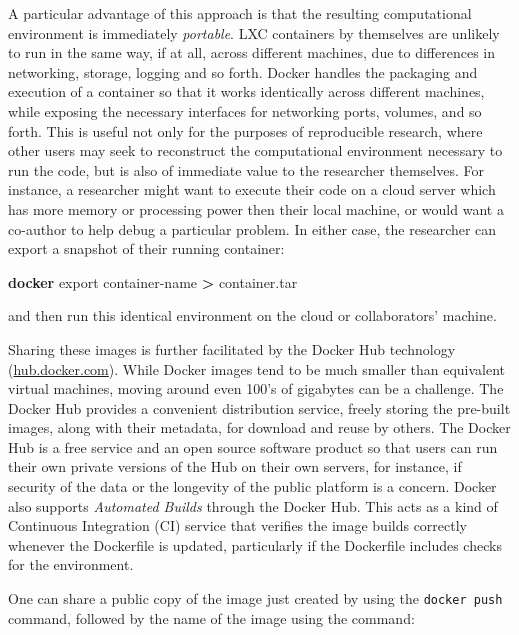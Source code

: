 \documentclass[9pt]{components/acm_proc_article-sp}
\newenvironment{Shaded}{\begin{snugshade}}{\end{snugshade}}
\newcommand{\KeywordTok}[1]{\textcolor[rgb]{0.13,0.29,0.53}{\textbf{{#1}}}}
\newcommand{\NormalTok}[1]{{#1}}
\begin{document}
A particular advantage of this approach is that the resulting
computational environment is immediately \emph{portable}. LXC containers
by themselves are unlikely to run in the same way, if at all, across
different machines, due to differences in networking, storage, logging
and so forth. Docker handles the packaging and execution of a container
so that it works identically across different machines, while exposing
the necessary interfaces for networking ports, volumes, and so forth.
This is useful not only for the purposes of reproducible research, where
other users may seek to reconstruct the computational environment
necessary to run the code, but is also of immediate value to the
researcher themselves. For instance, a researcher might want to execute
their code on a cloud server which has more memory or processing power
then their local machine, or would want a co-author to help debug a
particular problem. In either case, the researcher can export a snapshot
of their running container:

\begin{Shaded}
\begin{Highlighting}[]
\KeywordTok{docker} \NormalTok{export container-name }\KeywordTok{>} \NormalTok{container.tar}
\end{Highlighting}
\end{Shaded}

and then run this identical environment on the cloud or collaborators'
machine.

Sharing these images is further facilitated by the Docker Hub technology
(\href{http://hub.docker.com}{hub.docker.com}). While Docker images tend
to be much smaller than equivalent virtual machines, moving around even
100's of gigabytes can be a challenge. The Docker Hub provides a
convenient distribution service, freely storing the pre-built images,
along with their metadata, for download and reuse by others. The Docker
Hub is a free service and an open source software product so that users
can run their own private versions of the Hub on their own servers, for
instance, if security of the data or the longevity of the public
platform is a concern. Docker also supports \emph{Automated Builds}
through the Docker Hub. This acts as a kind of Continuous Integration
(CI) service that verifies the image builds correctly whenever the
Dockerfile is updated, particularly if the Dockerfile includes checks
for the environment.

One can share a public copy of the image just created by using the
\texttt{docker push} command, followed by the name of the image using
the command:
\end{document}
